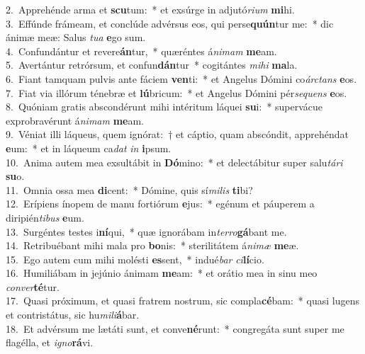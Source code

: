 {2.~}Apprehénde arma et \textbf{scu}tum:~* et exsúrge in adjutó\textit{ri}\textit{um} \textbf{mi}hi.\\
{3.~}Effúnde frámeam, et conclúde advérsus eos, qui perse\textbf{quún}tur me:~* dic ánimæ meæ: Salus \textit{tu}\textit{a} \textbf{e}go sum.\\
{4.~}Confundántur et revere\textbf{án}tur,~* quæréntes á\textit{ni}\textit{mam} \textbf{me}am.\\
{5.~}Avertántur retrórsum, et confun\textbf{dán}tur~* cogitántes \textit{mi}\textit{hi} \textbf{ma}la.\\
{6.~}Fiant tamquam pulvis ante fáciem \textbf{ven}ti:~* et Angelus Dómini co\textit{ár}\textit{ctans} \textbf{e}os.\\
{7.~}Fiat via illórum ténebræ et \textbf{lú}bricum:~* et Angelus Dómini pér\textit{se}\textit{quens} \textbf{e}os.\\
{8.~}Quóniam gratis abscondérunt mihi intéritum láquei \textbf{su}i:~* supervácue exprobravérunt á\textit{ni}\textit{mam} \textbf{me}am.\\
{9.~}Véniat illi láqueus, quem ignórat:~† et cáptio, quam abscóndit, apprehéndat \textbf{e}um:~* et in láqueum ca\textit{dat} \textit{in} \textbf{i}psum.\\
{10.~}Anima autem mea exsultábit in \textbf{Dó}mino:~* et delectábitur super salu\textit{tá}\textit{ri} \textbf{su}o.\\
{11.~}Omnia ossa mea \textbf{di}cent:~* Dómine, quis sí\textit{mi}\textit{lis} \textbf{ti}bi?\\
{12.~}Erípiens ínopem de manu fortiórum \textbf{e}jus:~* egénum et páuperem a diripién\textit{ti}\textit{bus} \textbf{e}um.\\
{13.~}Surgéntes testes i\textbf{ní}qui,~* quæ ignorábam in\textit{ter}\textit{ro}\textbf{gá}bant me.\\
{14.~}Retribuébant mihi mala pro \textbf{bo}nis:~* sterilitátem á\textit{ni}\textit{mæ} \textbf{me}æ.\\
{15.~}Ego autem cum mihi molésti \textbf{es}sent,~* indué\textit{bar} \textit{ci}\textbf{lí}cio.\\
{16.~}Humiliábam in jejúnio ánimam \textbf{me}am:~* et orátio mea in sinu meo \textit{con}\textit{ver}\textbf{té}tur.\\
{17.~}Quasi próximum, et quasi fratrem nostrum, sic compla\textbf{cé}bam:~* quasi lugens et contristátus, sic hu\textit{mi}\textit{li}\textbf{á}bar.\\
{18.~}Et advérsum me lætáti sunt, et conve\textbf{né}runt:~* congregáta sunt super me flagélla, et \textit{i}\textit{gno}\textbf{rá}vi.\\
